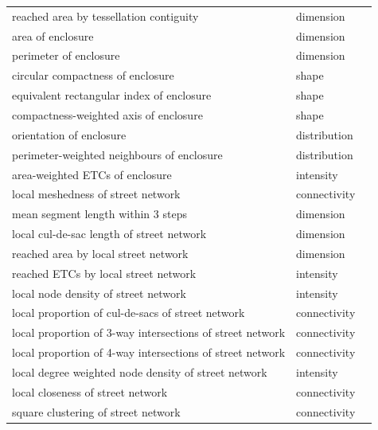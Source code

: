 \documentclass[fleqn,10pt]{wlscirep}
\begin{document}
\begin{longtable}{lll}
                reached area by tessellation contiguity &    dimension &  \cite{fleischmann2021} \\
                                        area of enclosure &    dimension & \cite{dibble2019origin} \\
                                perimeter of enclosure &    dimension &          \cite{gil2012} \\
                        circular compactness of enclosure &        shape &     \cite{schirmer2015} \\
                equivalent rectangular index of enclosure &        shape &    \cite{basaraner2017} \\
                compactness-weighted axis of enclosure &        shape &   \cite{feliciotti2018} \\
                                orientation of enclosure & distribution &          \cite{gil2012} \\
            perimeter-weighted neighbours of enclosure & distribution &  \cite{fleischmann2021} \\
                        area-weighted ETCs of enclosure &    intensity &  \cite{fleischmann2021} \\
                    local meshedness of street network & connectivity &   \cite{feliciotti2018} \\
                    mean segment length within 3 steps &    dimension &  \cite{fleischmann2021} \\
                local cul-de-sac length of street network &    dimension &  \cite{fleischmann2021} \\
                    reached area by local street network &    dimension &  \cite{fleischmann2021} \\
                    reached ETCs by local street network &    intensity &  \cite{fleischmann2021} \\
                    local node density of street network &    intensity &  \cite{fleischmann2021} \\
        local proportion of cul-de-sacs of street network & connectivity &        \cite{lowry2014} \\
    local proportion of 3-way intersections of street network & connectivity &       \cite{boeing2018} \\
    local proportion of 4-way intersections of street network & connectivity &       \cite{boeing2018} \\
    local degree weighted node density of street network &    intensity & \cite{dibble2019origin} \\
                        local closeness of street network & connectivity &        \cite{porta2006} \\
                    square clustering of street network & connectivity &  \cite{fleischmann2021} \\
\end{longtable}
\end{document}
